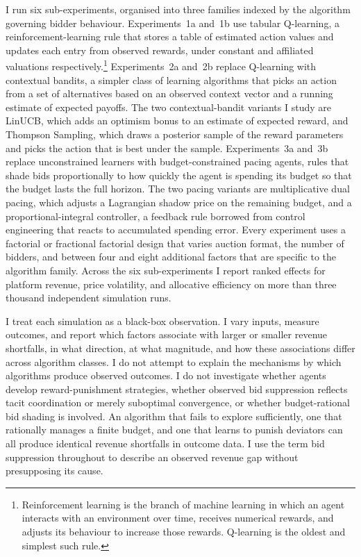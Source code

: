 I run six sub-experiments, organised into three families indexed by the algorithm governing bidder behaviour. Experiments~1a and~1b use tabular Q-learning, a reinforcement-learning rule that stores a table of estimated action values and updates each entry from observed rewards, under constant and affiliated valuations respectively.\footnote{Reinforcement learning is the branch of machine learning in which an agent interacts with an environment over time, receives numerical rewards, and adjusts its behaviour to increase those rewards. Q-learning is the oldest and simplest such rule.} Experiments~2a and~2b replace Q-learning with contextual bandits, a simpler class of learning algorithms that picks an action from a set of alternatives based on an observed context vector and a running estimate of expected payoffs. The two contextual-bandit variants I study are LinUCB, which adds an optimism bonus to an estimate of expected reward, and Thompson Sampling, which draws a posterior sample of the reward parameters and picks the action that is best under the sample. Experiments~3a and~3b replace unconstrained learners with budget-constrained pacing agents, rules that shade bids proportionally to how quickly the agent is spending its budget so that the budget lasts the full horizon. The two pacing variants are multiplicative dual pacing, which adjusts a Lagrangian shadow price on the remaining budget, and a proportional-integral controller, a feedback rule borrowed from control engineering that reacts to accumulated spending error. Every experiment uses a factorial or fractional factorial design that varies auction format, the number of bidders, and between four and eight additional factors that are specific to the algorithm family. Across the six sub-experiments I report ranked effects for platform revenue, price volatility, and allocative efficiency on more than three thousand independent simulation runs.

I treat each simulation as a black-box observation. I vary inputs, measure outcomes, and report which factors associate with larger or smaller revenue shortfalls, in what direction, at what magnitude, and how these associations differ across algorithm classes. I do not attempt to explain the mechanisms by which algorithms produce observed outcomes. I do not investigate whether agents develop reward-punishment strategies, whether observed bid suppression reflects tacit coordination or merely suboptimal convergence, or whether budget-rational bid shading is involved. An algorithm that fails to explore sufficiently, one that rationally manages a finite budget, and one that learns to punish deviators can all produce identical revenue shortfalls in outcome data. I use the term bid suppression throughout to describe an observed revenue gap without presupposing its cause.

